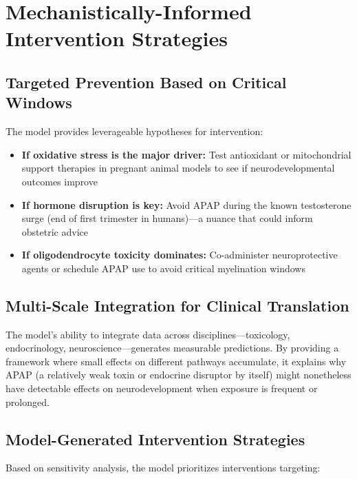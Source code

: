 \documentclass[11pt]{article}
\let\oldsection\section
\renewcommand{\section}[1]{\oldsection{#1}\setlength{\leftskip}{0em}}
\let\oldsubsection\subsection
\renewcommand{\subsection}[1]{\oldsubsection{#1}\setlength{\leftskip}{0.75em}}
\begin{document}
\section{Mechanistically-Informed Intervention Strategies}

\subsection{Targeted Prevention Based on Critical Windows}
The model provides leverageable hypotheses for intervention:

\begin{itemize}
    \item \textbf{If oxidative stress is the major driver:} Test antioxidant or mitochondrial support therapies in pregnant animal models to see if neurodevelopmental outcomes improve
    
    \item \textbf{If hormone disruption is key:} Avoid APAP during the known testosterone surge (end of first trimester in humans)—a nuance that could inform obstetric advice
    
    \item \textbf{If oligodendrocyte toxicity dominates:} Co-administer neuroprotective agents or schedule APAP use to avoid critical myelination windows
\end{itemize}

\subsection{Multi-Scale Integration for Clinical Translation}
The model's ability to integrate data across disciplines—toxicology, endocrinology, neuroscience—generates measurable predictions. By providing a framework where small effects on different pathways accumulate, it explains why APAP (a relatively weak toxin or endocrine disruptor by itself) might nonetheless have detectable effects on neurodevelopment when exposure is frequent or prolonged.

\subsection{Model-Generated Intervention Strategies}

Based on sensitivity analysis, the model prioritizes interventions targeting:
\end{document}
